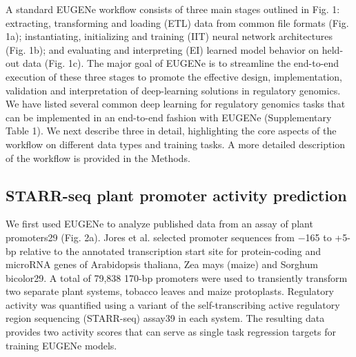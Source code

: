 A standard EUGENe workflow consists of three main stages outlined in Fig. 1: extracting, transforming and loading (ETL) data from common file formats (Fig. 1a); instantiating, initializing and training (IIT) neural network architectures (Fig. 1b); and evaluating and interpreting (EI) learned model behavior on held-out data (Fig. 1c). The major goal of EUGENe is to streamline the end-to-end execution of these three stages to promote the effective design, implementation, validation and interpretation of deep-learning solutions in regulatory genomics. We have listed several common deep learning for regulatory genomics tasks that can be implemented in an end-to-end fashion with EUGENe (Supplementary Table 1). We next describe three in detail, highlighting the core aspects of the workflow on different data types and training tasks. A more detailed description of the workflow is provided in the Methods.

\subsection{STARR-seq plant promoter activity prediction}

We first used EUGENe to analyze published data from an assay of plant promoters29 (Fig. 2a). Jores et al. selected promoter sequences from −165 to +5-bp relative to the annotated transcription start site for protein-coding and microRNA genes of Arabidopsis thaliana, Zea mays (maize) and Sorghum bicolor29. A total of 79,838 170-bp promoters were used to transiently transform two separate plant systems, tobacco leaves and maize protoplasts. Regulatory activity was quantified using a variant of the self-transcribing active regulatory region sequencing (STARR-seq) assay39 in each system. The resulting data provides two activity scores that can serve as single task regression targets for training EUGENe models.

